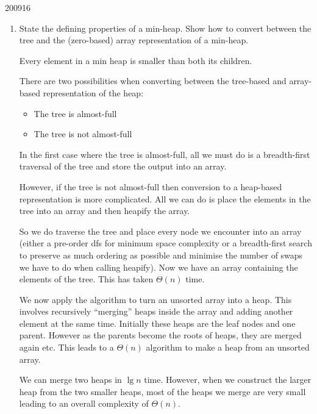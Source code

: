 \documentclass[10pt,\jkfside,a4paper]{article}
\begin{document}
\begin{examquestion}{2009}{1}{6}

\begin{enumerate}[label=(\alph*)]

\item State the defining properties of a min-heap. Show how to convert between the
tree and the (zero-based) array representation of a min-heap.

Every element in a min heap is smaller than both its children.

There are two possibilities when converting between the tree-based and array-based representation 
of the heap:

\begin{itemize}

\item The tree is almost-full

\item The tree is not almost-full

\end{itemize}

In the first case where the tree is almost-full, all we must do is a breadth-first traversal 
of the tree and store the output into an array.

However, if the tree is not almost-full then conversion to a heap-based representation is more 
complicated. All we can do is place the elements in the tree into an array and then heapify the 
array.

So we do traverse the tree and place every node we encounter into an array (either
a pre-order dfs for minimum space complexity or a breadth-first search to preserve as much ordering 
as possible and minimise the number of swaps we have to do when calling heapify). 
Now we have an array containing the elements of the tree. This has taken $\Theta(n)$ time.

We now apply the algorithm to turn an unsorted array into a heap. This involves recursively 
``merging'' heaps inside the array and adding another element at the same time. Initially these 
heaps are the leaf nodes and one parent. However as the parents become the roots of heaps, they are 
merged again etc. This leads to a $\Theta(n)$ algorithm to make a heap from an unsorted array.

We can merge two heaps in $\lg n$ time. However, when we construct the larger heap from the two 
smaller heaps, most of the heaps we merge are very small leading to an overall complexity of 
$\Theta(n)$. 


\end{enumerate}
\end{examquestion}
\end{document}
